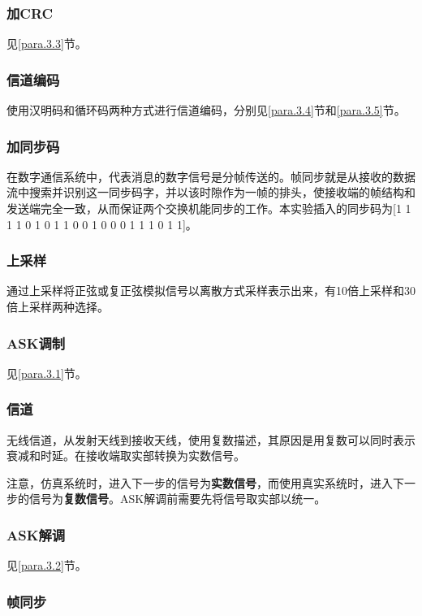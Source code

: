 \documentclass[UTF8]{ctexart}
\begin{document}
\subsubsection{加CRC}

见\ref{para.3.3}节。

\subsubsection{信道编码}
使用汉明码和循环码两种方式进行信道编码，分别见\ref{para.3.4}节和\ref{para.3.5}节。

\subsubsection{加同步码}
在数字通信系统中，代表消息的数字信号是分帧传送的。帧同步就是从接收的数据流中搜索并识别这一同步码字，并以该时隙作为一帧的排头，使接收端的帧结构和发送端完全一致，从而保证两个交换机能同步的工作。本实验插入的同步码为[1 1 1 1 0 1 0 1 1 0 0 1 0 0 0 1 1 1 0 1 1]。

\subsubsection{上采样}

通过上采样将正弦或复正弦模拟信号以离散方式采样表示出来，有10倍上采样和30倍上采样两种选择。

\subsubsection{ASK调制}

见\ref{para.3.1}节。

\subsubsection{信道}

无线信道，从发射天线到接收天线，使用复数描述，其原因是用复数可以同时表示衰减和时延。在接收端取实部转换为实数信号。

注意，仿真系统时，进入下一步的信号为\textbf{实数信号}，而使用真实系统时，进入下一步的信号为\textbf{复数信号}。ASK解调前需要先将信号取实部以统一。

\subsubsection{ASK解调}

见\ref{para.3.2}节。

\subsubsection{帧同步}
\end{document}
